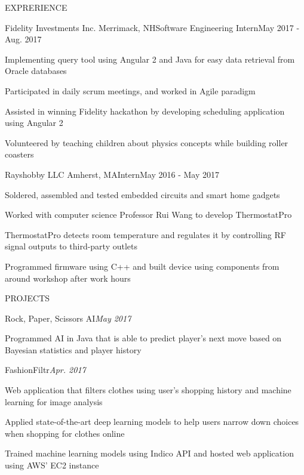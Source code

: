 \documentclass{resume} %
\begin{document}
	\begin{rSection}{EXPRERIENCE}
			
		\begin{rSubsection}{Fidelity Investments Inc.} {Merrimack, NH}{Software Engineering Intern}{May 2017 - Aug. 2017}
			\item Implementing query tool using Angular 2 and Java for easy data retrieval from Oracle databases
			\item Participated in daily scrum meetings, and worked in Agile paradigm
			\item Assisted in winning Fidelity hackathon by developing scheduling application using Angular 2
			\item Volunteered by teaching children about physics concepts while building roller coasters
		\end{rSubsection}
	
		\begin{rSubsection}{Rayshobby LLC} {Amherst, MA}{Intern}{May 2016 - May 2017}
			\item Soldered, assembled and tested embedded circuits and smart home gadgets
			\item Worked with computer science Professor Rui Wang to develop ThermostatPro
			\item ThermostatPro detects room temperature and regulates it by controlling RF signal outputs to third-party outlets
			\item Programmed firmware using C++ and built device using components from around workshop after work hours
		\end{rSubsection}
	
	\end{rSection}
	
	
	\begin{rSection}{PROJECTS}
	
		\begin{rSubsection}{Rock, Paper, Scissors AI}{\textit{May 2017}}{}{}
			\item Programmed AI in Java that is able to predict player's next move based on Bayesian statistics and player history
		\end{rSubsection}
	
		\begin{rSubsection}{FashionFiltr}{\textit{Apr. 2017}}{}{}
			\item Web application that filters clothes using user's shopping history and machine learning for image analysis
			\item Applied state-of-the-art deep learning models to help users narrow down choices when shopping for clothes online
			\item Trained machine learning models using Indico API and hosted web application using AWS' EC2 instance
		\end{rSubsection}
	
	\end{rSection}
\end{document}
